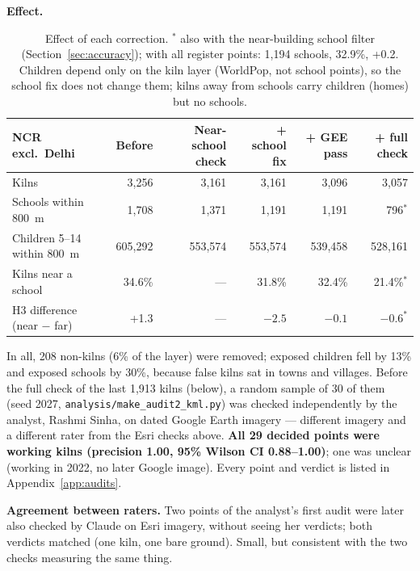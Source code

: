 \documentclass[11pt,a4paper]{article}
\begin{document}
\textbf{Effect.}
\begin{table}[H]
\centering\small
\begin{tabular}{@{}lrrrrr@{}}
\toprule
NCR excl.\ Delhi & Before & Near-school check & + school fix & + GEE pass & + full check \\
\midrule
Kilns                         & 3{,}256   & 3{,}161   & 3{,}161   & 3{,}096   & 3{,}057 \\
Schools within 800~m          & 1{,}708   & 1{,}371   & 1{,}191   & 1{,}191   & 796$^{*}$ \\
Children 5--14 within 800~m   & 605{,}292 & 553{,}574 & 553{,}574 & 539{,}458 & 528{,}161 \\
Kilns near a school           & 34.6\%    & ---       & 31.8\%    & 32.4\%    & 21.4\%$^{*}$ \\
H3 difference (near $-$ far)   & +1.3      & ---       & $-2.5$    & $-0.1$    & $-0.6^{*}$ \\
\bottomrule
\end{tabular}
\caption{Effect of each correction. $^{*}$ also with the near-building school filter (Section~\ref{sec:accuracy}); with all register points: 1{,}194 schools, 32.9\%, +0.2. Children depend only on the kiln layer
(WorldPop, not school points), so the school fix does not change them; kilns
away from schools carry children (homes) but no schools.}
\end{table}

In all, 208 non-kilns (6\% of the layer) were removed; exposed children fell by
13\% and exposed schools by 30\%, because false kilns sat in towns and villages.
Before the full check of the last 1{,}913 kilns (below), a random sample of 30 of them (seed 2027, \texttt{analysis/make\_audit2\_kml.py})
was checked independently by the analyst, Rashmi Sinha, on dated Google Earth
imagery --- different imagery and a different rater from the Esri checks above.
\textbf{All 29 decided points were working kilns (precision 1.00, 95\% Wilson CI
0.88--1.00)}; one was unclear (working in 2022, no later Google image). Every
point and verdict is listed in Appendix~\ref{app:audits}.

\textbf{Agreement between raters.} Two points of the analyst's first audit were
later also checked by Claude on Esri imagery, without seeing her verdicts; both
verdicts matched (one kiln, one bare ground). Small, but consistent with the two
checks measuring the same thing.
\end{document}

